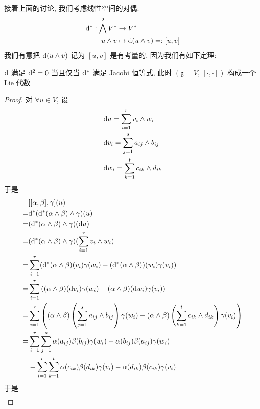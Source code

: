     接着上面的讨论, 我们考虑线性空间的对偶:
    \begin{align*}
        {\rm d}^*:\bigwedge^2V^*&\rightarrow V^*\\
        u\wedge v&\mapsto {\rm d}(u\wedge v)=:[u,v]
    \end{align*}
    我们有意把 ${\rm d}(u\wedge v)$ 记为 $[u,v]$ 是有考量的, 因为我们有如下定理:
    \begin{theorem}\label{lie}
        ${\rm d}$ 满足 ${\rm d}^2 = 0$ 当且仅当 ${\rm d}^*$ 满足 {\rm Jacobi} 恒等式, 此时 $(\mathfrak{g} = V,\,[\cdot,\cdot])$ 构成一个 {\rm Lie} 代数
    \end{theorem}
    \begin{proof}
        对 $\forall u\in V$, 设 
        \begin{align*}
            &{\rm d} u=\sum\limits_{i=1}^{r}v_i\wedge w_i \\
            &{\rm d} v_i=\sum\limits_{j=1}^{s}a_{ij}\wedge b_{ij} \\
            &{\rm d} w_i=\sum\limits_{k=1}^{t}c_{ik}\wedge d_{ik}
        \end{align*}
        于是
        \begin{align*}
            &[[\alpha,\beta],\gamma](u) \\
            =&{\rm d}^*({\rm d}^*(\alpha\wedge\beta)\wedge\gamma)(u) \\
            =&({\rm d}^*(\alpha\wedge\beta)\wedge\gamma)({\rm d} u) \\
            =&({\rm d}^*(\alpha\wedge\beta)\wedge\gamma)(\sum_{i=1}^{r}v_i\wedge w_i) \\
            =&\sum_{i=1}^{r}({\rm d}^*(\alpha\wedge\beta)(v_i)\gamma(w_i)-({\rm d}^*(\alpha\wedge\beta))(w_i)\gamma(v_i)) \\
            =&\sum_{i=1}^{r}\left((\alpha\wedge\beta)({\rm d} v_i)\gamma(w_i)-(\alpha\wedge\beta)({\rm d} w_i)\gamma(v_i)\right) \\
            =&\sum_{i=1}^{r}\left((\alpha\wedge\beta)\left(\sum_{j=1}^{s}a_{ij}\wedge b_{ij}\right)\gamma(w_i)-(\alpha\wedge\beta)\left(\sum_{k=1}^{t}c_{ik}\wedge d_{ik}\right)\gamma(v_i)\right) \\
            =&\sum_{i=1}^{r}\sum_{j=1}^{s}\alpha(a_{ij})\beta(b_{ij})\gamma(w_i)-\alpha(b_{ij})\beta(a_{ij})\gamma(w_i) \\
            &-\sum_{i=1}^{r}\sum_{k=1}^{t}\alpha(c_{ik})\beta(d_{ik})\gamma(v_i)-\alpha(d_{ik})\beta(c_{ik})\gamma(v_i) \\
        \end{align*}
        于是
        \begin{align*}

\end{align*}
\end{proof}
